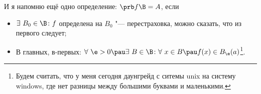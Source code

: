 
 	И я напомню ещё одно определение: $\prb f\B=A$, если
 	\begin{itemize}
 	  \item [0)] $\exists\  B_0 \in\B\colon f$ определена на $B_0$ "--- перестраховка, можно сказать, что из первого следует;
 	  \item [1)] В главных, в-первых: $\forall\ \e>0\pau \exists\  B\in\B\colon \forall\  x\in B\pau f(x)\in B_\e(a)$\footnote{Будем считать, что
 	  у меня сегодня даунгрейд с ситемы unix на систему windows, где нет разницы между большими буквами и маленькими.}.
 	\end{itemize}
 